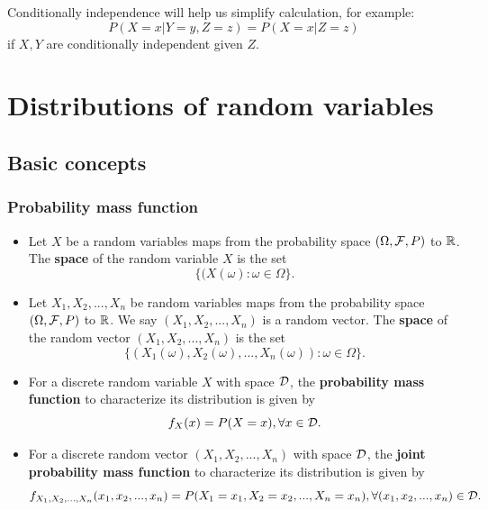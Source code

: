 \begin{refsection}
\begin{remark}
Conditionally independence will help us simplify calculation, for example:
$$P(X=x|Y=y,Z=z)=P(X=x|Z=z)$$
if $X,Y$ are conditionally independent given $Z$.	
\end{remark}







\section{Distributions of random variables}

\subsection{Basic concepts}

\subsubsection{Probability mass function}
\begin{definition}\cite[75]{hoggintroduction}\hfill
\begin{itemize}
	\item Let $X$ be a random variables maps from the probability space $(\Omega,\mathcal{F},P)$ to $\mathbb{R}$.  The \textbf{space} of the random variable $X$ is the set
	$$\{(X(\omega):\omega \in \Omega \}.$$
	
	\item Let $X_1,X_2,...,X_n$ be random variables maps from the probability space $(\Omega,\mathcal{F},P)$ to $\mathbb{R}$.  We say $(X_1,X_2,...,X_n)$ is a random vector. The \textbf{space} of the random vector $(X_1,X_2,...,X_n)$ is the set
	$$\{(X_1(\omega),X_2(\omega),...,X_n(\omega)):\omega \in \Omega \}.$$
\end{itemize}	
\end{definition}





\begin{definition}\cite{casella2002statistical}\hfill
\begin{itemize}
	\item For a discrete random variable $X$ with space $\mathcal{D}$, the \textbf{probability mass function} to characterize its distribution is given by
	$$f_X(x)=P(X=x),\forall x \in \mathcal{D}.$$
	\item For a discrete random vector $(X_1,X_2,...,X_n)$ with space $\mathcal{D}$, the \textbf{joint probability mass function} to characterize its distribution is given by
	$$f_{X_1,X_2,...,X_n}(x_1,x_2,...,x_n)=P(X_1=x_1,X_2= x_2,...,X_n=x_n),\forall (x_1,x_2,...,x_n) \in \mathcal{D}.$$
\end{itemize}	
\end{definition}









\end{refsection}
